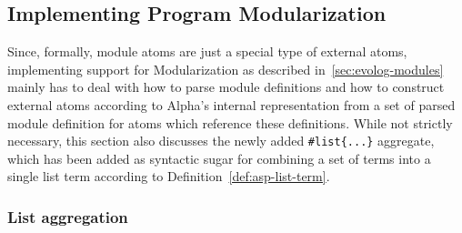 \subsection{Implementing Program Modularization}

Since, formally, module atoms are just a special type of external atoms, implementing support for Modularization as described in~\ref{sec:evolog-modules} mainly has to deal with how to parse module definitions and how to construct external atoms according to Alpha's internal representation from a set of parsed module definition for atoms which reference these definitions. While not strictly necessary, this section also discusses the newly added \texttt{\#list\{...\}} aggregate, which has been added as syntactic sugar for combining a set of terms into a single list term according to Definition~\ref{def:asp-list-term}.

\subsubsection{List aggregation}

